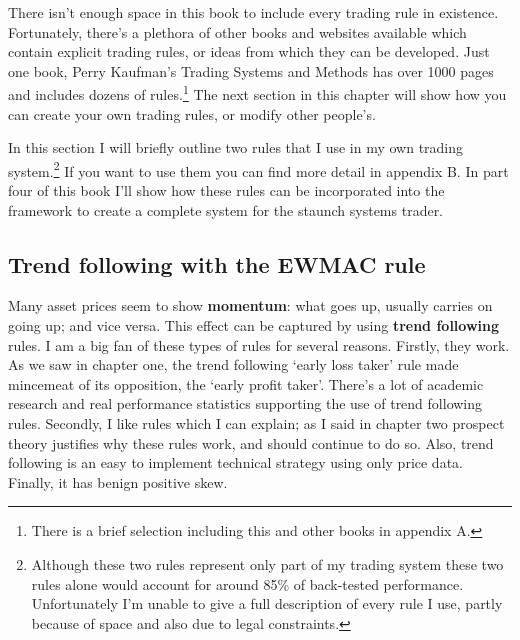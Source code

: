 There isn't enough space in this book to include every trading rule in existence. Fortunately, there's a plethora of other books and websites available which contain explicit trading rules, or ideas from which they can be developed. Just one book, Perry Kaufman's Trading Systems and Methods has over 1000 pages and includes dozens of rules.\footnote{There is a brief selection including this and other books in appendix A.} The next section in this chapter will show how you can create your own trading rules, or modify other people's.

In this section I will briefly outline two rules that I use in my own trading system.\footnote{Although these two rules represent only part of my trading system these two rules alone would account for around 85\% of back-tested performance. Unfortunately I'm unable to give a full description of every rule I use, partly because of space and also due to legal constraints.} If you want to use them you can find more detail in appendix B. In part four of this book I'll show how these rules can be incorporated into the framework to create a complete system for the staunch systems trader.

\subsection*{Trend following with the EWMAC rule}

Many asset prices seem to show \textbf{momentum}: what goes up, usually carries on going up; and vice versa. This effect can be captured by using \textbf{trend following} rules. I am a big fan of these types of rules for several reasons. Firstly, they work. As we saw in chapter one, the trend following ‘early loss taker' rule made mincemeat of its opposition, the ‘early profit taker'. There's a lot of academic research and real performance statistics supporting the use of trend following rules. Secondly, I like rules which I can explain; as I said in chapter two prospect theory justifies why these rules work, and should continue to do so. Also, trend following is an easy to implement technical strategy using only price data. Finally, it has benign positive skew.

